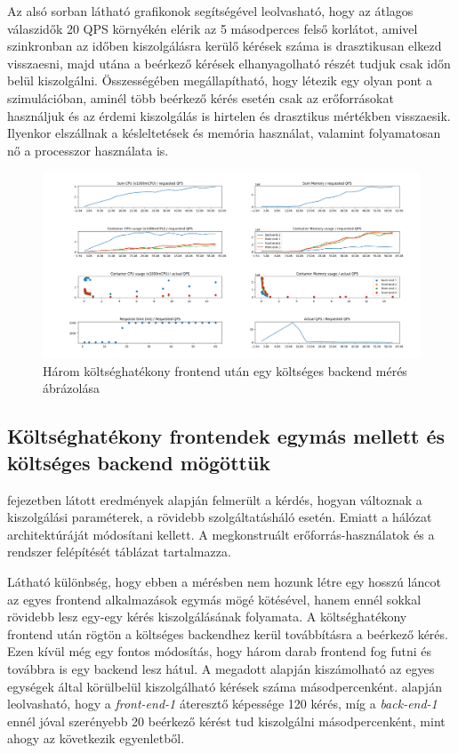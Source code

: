 Az alsó sorban látható grafikonok segítségével leolvasható, hogy az átlagos válaszidők 20 QPS környékén elérik az 5 másodperces felső korlátot, amivel szinkronban az időben kiszolgálásra kerülő kérések száma is drasztikusan elkezd visszaesni, majd utána a beérkező kérések elhanyagolható részét tudjuk csak időn belül kiszolgálni. 
Összességében megállapítható, hogy létezik egy olyan pont a szimulációban, aminél több beérkező kérés esetén csak az erőforrásokat használjuk és az érdemi kiszolgálás is hirtelen és drasztikus mértékben visszaesik.
Ilyenkor elszállnak a késleltetések és memória használat, valamint folyamatosan nő a processzor használata is.

\begin{figure}[!ht]
	\centering
	\includegraphics[width=150mm, keepaspectratio]{figures/taildrop-chain-3FE-1BE_requestedQPS.png}
	\caption{Három költséghatékony frontend után egy költséges backend mérés ábrázolása}
	\label{fig:3FE_1BE_chain}
\end{figure}

\subsection{Költséghatékony frontendek egymás mellett és költséges backend mögöttük}
\label{subsec:3FE_1BE_stack}
 fejezetben látott eredmények alapján felmerült a kérdés, hogyan változnak a kiszolgálási paraméterek, a rövidebb szolgáltatásháló esetén. 
Emiatt a hálózat architektúráját módosítani kellett.
A megkonstruált erőforrás-használatok és a rendszer felépítését  táblázat tartalmazza. 

Látható különbség, hogy ebben a mérésben nem hozunk létre egy hosszú láncot az egyes frontend alkalmazások egymás mögé kötésével, hanem ennél sokkal rövidebb lesz egy-egy kérés kiszolgálásának folyamata. 
A költséghatékony frontend után rögtön a költséges backendhez kerül továbbításra a beérkező kérés.
Ezen kívül még egy fontos módosítás, hogy három darab frontend fog futni és továbbra is egy backend lesz hátul.
A megadott alapján kiszámolható az egyes egységek által körülbelül kiszolgálható kérések száma másodpercenként.
 alapján leolvasható, hogy a \textit{front-end-1} áteresztő képessége 120 kérés, míg a \textit{back-end-1} ennél jóval szerényebb 20 beérkező kérést tud kiszolgálni másodpercenként, mint ahogy az következik  egyenletből.


